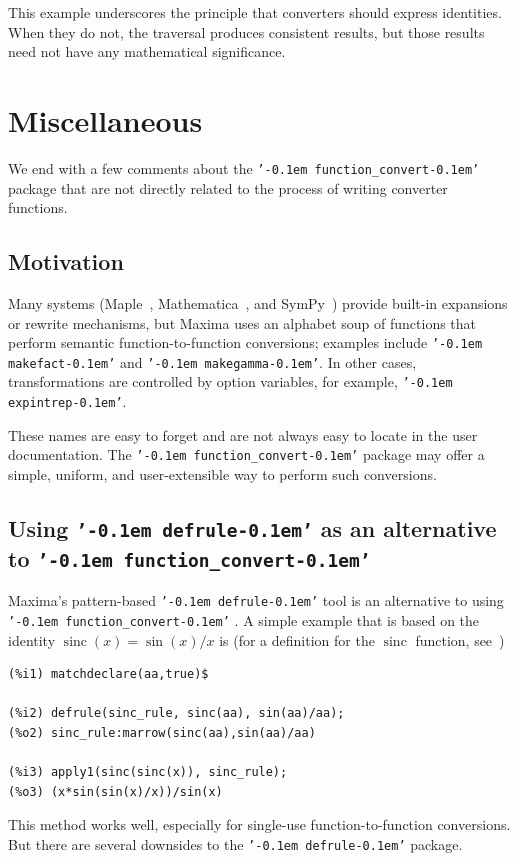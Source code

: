 \documentclass[12pt,fleqn]{extarticle}
\newcommand{\ttq}[1]{\texttt{'\kern-0.1em #1\kern-0.1em'}}
\newcommand{\funconvert}{\ttq{function\_convert}{ }}
\newenvironment{maximabox}
  {\begin{tcolorbox}[
      breakable,
      enhanced,
      colback=white,
      colframe=black!8,
      boxrule=0pt,
      borderline west={2.2pt}{0pt}{black!25},
      arc=1pt,
      left=11pt,
      right=7pt,
      top=9pt,
      bottom=9pt,
      before skip=14pt,
      after skip=14pt
    ]}
  {\end{tcolorbox}}
\DeclareMathOperator{\sinc}{sinc}
\begin{document}
This example underscores the principle that converters should express
identities.  When they do not, the traversal produces consistent results, but 
those results need not have any mathematical significance.

\section{Miscellaneous}

We end with a few comments about the \funconvert package that are not directly related to the process of writing converter functions.

\subsection {Motivation} 

Many systems (Maple~\cite{maple-convert}, Mathematica~\cite{mathematica-rules}, and SymPy~\cite{sympy-rewrite}) provide built-in expansions or rewrite mechanisms, but Maxima uses an alphabet soup of 
functions that perform semantic function-to-function conversions; examples include  \ttq{makefact}
and \ttq{makegamma}. In other cases, transformations are controlled by option variables, for example, 
\ttq{expintrep}. 

These names are easy to forget and are not always easy to locate in the user documentation. 
The \funconvert package may offer a simple, uniform, and user-extensible way to perform such conversions.

\subsection{Using  \ttq{defrule} as an alternative to \funconvert}

Maxima's pattern-based \ttq{defrule} tool is an alternative to using \funconvert. A simple
example that is based on the identity \(\sinc(x) = \sin(x)/x\) is (for a definition for the $\sinc$ function,
see~\cite{mathworld-sinc})
\begin{maximabox}
\begin{verbatim}
(%i1) matchdeclare(aa,true)$

(%i2) defrule(sinc_rule, sinc(aa), sin(aa)/aa);
(%o2) sinc_rule:marrow(sinc(aa),sin(aa)/aa)

(%i3) apply1(sinc(sinc(x)), sinc_rule);
(%o3) (x*sin(sin(x)/x))/sin(x)
\end{verbatim}
\end{maximabox}
This method works well, especially for single-use function-to-function conversions. But there are several downsides to the \ttq{defrule} package.
\end{document}
